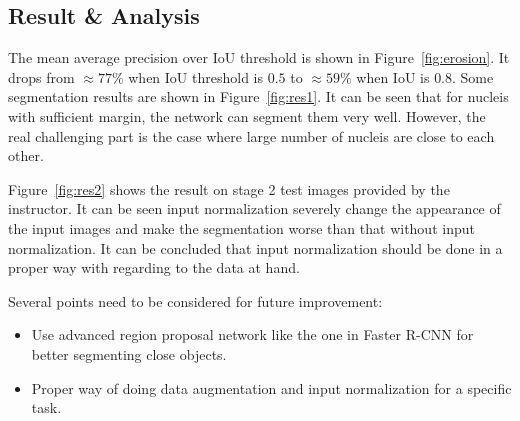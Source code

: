 \documentclass[runningheads]{llncs}
\begin{document}
\subsection{Result \& Analysis}
The mean average precision over IoU threshold is shown in Figure~\ref{fig:erosion}. It drops from $\approx 77\%$ when IoU threshold is $0.5$ to $\approx 59\%$ when IoU is $0.8$. Some segmentation results are shown in Figure~\ref{fig:res1}. It can be seen that for nucleis with sufficient margin, the network can segment them very well. However, the real challenging part is the case where large number of nucleis are close to each other.

Figure~\ref{fig:res2} shows the result on stage 2 test images provided by the instructor. It can be seen input normalization severely change the appearance of the input images and make the segmentation worse than that without input normalization. It can be concluded that input normalization should be done in a proper way with regarding to the data at hand.

Several points need to be considered for future improvement:
\begin{itemize}
	\item Use advanced region proposal network like the one in Faster R-CNN for better segmenting close objects.
	\item Proper way of doing data augmentation and input normalization for a specific task.
\end{itemize}
\end{document}
